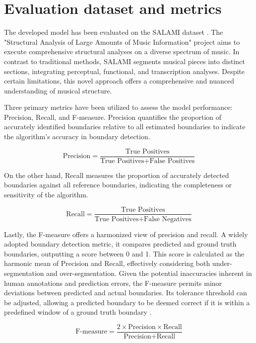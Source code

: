 
\section{Evaluation dataset and metrics}

The developed model has been evaluated on the SALAMI dataset \cite{Smith2011DESIGNANNOTATIONS}. The "Structural Analysis of Large Amounts of Music Information" project aims to execute comprehensive structural analyses on a diverse spectrum of music. In contrast to traditional methods, SALAMI segments musical pieces into distinct sections, integrating perceptual, functional, and transcription analyses. Despite certain limitations, this novel approach offers a comprehensive and nuanced understanding of musical structure.

Three primary metrics have been utilized to assess the model performance: Precision, Recall, and F-measure. Precision quantifies the proportion of accurately identified boundaries relative to all estimated boundaries to indicate the algorithm's accuracy in boundary detection.

\begin{equation}
\text{Precision} = \frac{\text{True Positives}}{\text{True Positives} + \text{False Positives}}
\end{equation}

On the other hand, Recall measures the proportion of accurately detected boundaries against all reference boundaries, indicating the completeness or sensitivity of the algorithm.

\begin{equation}
\text{Recall} = \frac{\text{True Positives}}{\text{True Positives} + \text{False Negatives}}
\end{equation}

Lastly, the F-measure offers a harmonized view of precision and recall. A widely adopted boundary detection metric, it compares predicted and ground truth boundaries, outputting a score between 0 and 1. This score is calculated as the harmonic mean of Precision and Recall, effectively considering both under-segmentation and over-segmentation. Given the potential inaccuracies inherent in human annotations and prediction errors, the F-measure permits minor deviations between predicted and actual boundaries. Its tolerance threshold can be adjusted, allowing a predicted boundary to be deemed correct if it is within a predefined window of a ground truth boundary \cite{Turnbull2007ABOOSTING, NietoPerceptualMusicb}.

\begin{equation}
\text{F-measure} = \frac{2 \times \text{Precision} \times \text{Recall}}{\text{Precision} + \text{Recall}}
\end{equation}

\newpage